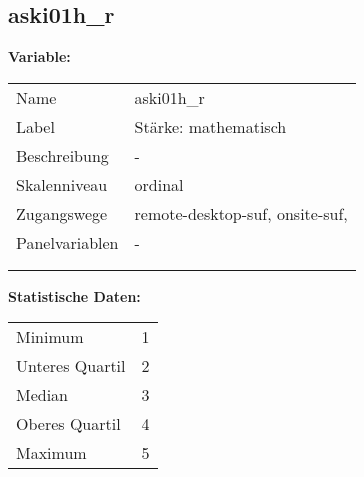	
	
	\subsection{aski01h\_r}
	\label{subSection:aski01h_r}

	\noindent\textbf{Variable:}\\
		\begin{tabular}{lL{11.3cm}}
			\label{tableVariable:aski01h_r}
			Name & aski01h\_r \\
			Label & Stärke: mathematisch \\
			Beschreibung & - \\
			Skalenniveau & ordinal \\
			Zugangswege &
				remote-desktop-suf,
				onsite-suf,
 \\
			Panelvariablen & -
			 \\
			 \\
 \\
		\end{tabular}



		\vspace*{1 cm}
		\noindent\textbf{Statistische Daten:}\\
			\begin{tabular}{ll}
				\label{tableStatistics:aski01h_r}
					Minimum & 1 \\
					Unteres Quartil & 2 \\
					Median & 3 \\
					Oberes Quartil & 4 \\
					Maximum & 5 \\
			\end{tabular}



